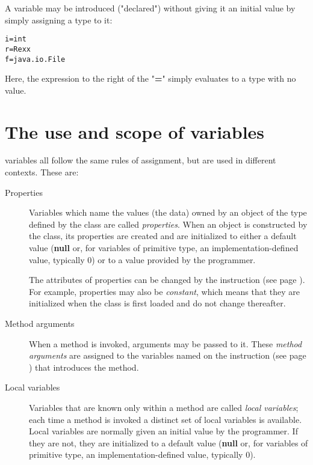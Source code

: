 A variable may be introduced ("declared") without giving it an
initial value by simply assigning a type to it:
\begin{lstlisting}
i=int
r=Rexx
f=java.io.File
\end{lstlisting}
Here, the expression to the right of the "\textbf{=}" simply
evaluates to a type with no value.
\section{The use and scope of variables}
 
\nr{} variables all follow the same rules of assignment, but are used
in different contexts.  These are:
\begin{description}
\item[Properties]\label{refprops}

Variables which name the values (the data) owned by an object of the
type defined by the class are called \emph{properties}.
When an object is constructed by the class, its properties are created
and are initialized to either a default value
(\textbf{null} or, for variables of primitive type, an
implementation-defined value, typically 0)
or to a value provided by the programmer.
 
The attributes of properties can be changed by the
 instruction (see page \pageref{refprop}).
For example, properties may also be \emph{constant}, which means
that they are initialized when the class is first loaded and do not
change thereafter.
\item[Method arguments]

When a method is invoked, arguments may be passed to it.
These \emph{method arguments} are assigned to the variables named on
the   instruction (see page \pageref{refmethod})  that introduces the
method.
\item[Local variables]

Variables that are known only within a method are called \emph{local
variables}; each time a method is invoked a distinct set of local
variables is available.
Local variables are normally given an initial value by the programmer.
If they are not, they are initialized to a default value
(\textbf{null} or, for variables of primitive type, an
implementation-defined value, typically 0).
\end{description}
 
